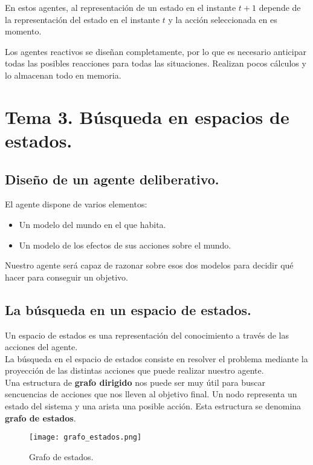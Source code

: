 \documentclass[12pt,spanish]{article}
\numberwithin{definition}{subsection}
\begin{document}
En estos agentes, al representación de un estado en el instante $t+1$ depende de la representación del estado en el instante $t$ y la acción seleccionada en es momento.

Los agentes reactivos se diseñan completamente, por lo que es necesario anticipar todas las posibles reacciones para todas las situaciones. Realizan pocos cálculos y lo almacenan todo en memoria.


\section{Tema 3. Búsqueda en espacios de estados.}

\subsection{Diseño de un agente deliberativo.}

El agente dispone de varios elementos:
\begin{itemize}
	\item Un modelo del mundo en el que habita.
	\item Un modelo de los efectos de sus acciones sobre el mundo.
\end{itemize}

Nuestro agente será capaz de razonar sobre esos dos modelos para decidir qué hacer para conseguir un objetivo.

\subsection{La búsqueda en un espacio de estados.}

Un espacio de estados es una representación del conocimiento a través de las acciones del agente.\\
La búsqueda en el espacio de estados consiste en resolver el problema mediante la proyección de las distintas acciones que puede realizar nuestro agente. \\

Una estructura de \textbf{grafo dirigido} nos puede ser muy útil para buscar sencuencias de acciones que nos lleven al objetivo final. Un nodo representa un estado del sistema y una arista una posible acción. Esta estructura se denomina \textbf{grafo de estados}.

\begin{figure}
\centering
\texttt{[image: grafo\_estados.png]}
\caption{Grafo de estados.}
\end{figure}
\end{document}
